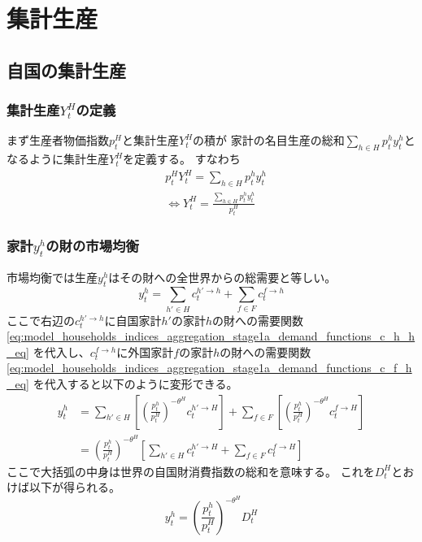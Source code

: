 
\chapter{集計生産}
\label{chap:main_appendix_aggregate_output}

\section{自国の集計生産}
\label{sec:main_appendix_aggregate_output_home}

\subsection{集計生産\(Y_t^H\)の定義}
\label{subsec:main_appendix_aggregate_output_home_def}
まず生産者物価指数\(p_t^H\)と集計生産\(Y_t^H\)の積が
家計の名目生産の総和\(\sum_{h\in H}p_t^hy_t^h\)となるように集計生産\(Y_t^H\)を定義する。
すなわち
\begin{align}
\label{eq:main_appendix_aggregate_output_home_Y_H_def}
    &p_t^HY_t^H=\sum_{h\in H}p_t^hy_t^h\\
    &\Leftrightarrow Y_t^H=\frac{\sum_{h\in H}p_t^hy_t^h}{p_t^H}
\end{align}

\subsection{家計\(y_t^h\)の財の市場均衡}
\label{sec:main_appendix_aggregate_output_home_equilibrium_y_h}
市場均衡では生産\(y_t^h\)はその財への全世界からの総需要と等しい。
\begin{equation}
\label{eq:main_appendix_aggregate_output_home_equilibrium_y_h_eq}
    y_t^h=\sum_{h'\in H}c_t^{h'\to h}+\sum_{f\in F}c_t^{f\to h}
\end{equation}
ここで右辺の\(c_t^{h'\to h}\)に自国家計\(h'\)の家計\(h\)の財への需要関数
\eqref{eq:model_households_indices_aggregation_stage1a_demand_functions_c_h_h_eq}
を代入し、\(c_t^{f\to h}\)に外国家計\(f\)の家計\(h\)の財への需要関数
\eqref{eq:model_households_indices_aggregation_stage1a_demand_functions_c_f_h_eq}
を代入すると以下のように変形できる。
\begin{align}
\label{eq:main_appendix_aggregate_output_home_equilibrium_y_h_modified_eq}
    y_t^h&=\sum_{h'\in H}\left[\left(\frac{p_t^h}{p_t^H}\right)^{-\theta^H}c_t^{h'\to H}\right]+\sum_{f\in F}\left[\left(\frac{p_t^h}{p_t^H}\right)^{-\theta^H}c_t^{f\to H}\right] \\
    &=\left(\frac{p_t^h}{p_t^H}\right)^{-\theta^H}\left[\sum_{h'\in H}c_t^{h'\to H}+\sum_{f\in F}c_t^{f\to H}\right] \nonumber
\end{align}
ここで大括弧の中身は世界の自国財消費指数の総和を意味する。
これを\(D_t^H\)とおけば以下が得られる。
\begin{equation}
\label{eq:main_appendix_aggregate_output_home_equilibrium_y_h_modified2_eq}
    y_t^h=\left(\frac{p_t^h}{p_t^H}\right)^{-\theta^H}D_t^H
\end{equation}

